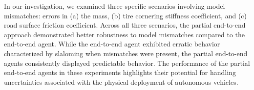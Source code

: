 In our investigation, we examined three specific scenarios involving model mismatches: errors in (a) the mass, (b) tire cornering stiffness coefficient, and (c) road surface friction coefficient. 
Across all three scenarios, the partial end-to-end approach demonstrated better robustness to model mismatches compared to the end-to-end agent. 
While the end-to-end agent exhibited erratic behavior characterized by slaloming when mismatches were present, the partial end-to-end agents consistently displayed predictable behavior. 
The performance of the partial end-to-end agents in these experiments highlights their potential for handling uncertainties associated with the physical deployment of autonomous vehicles.


